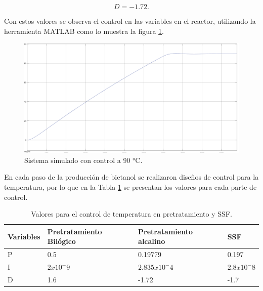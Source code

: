 \documentclass[12pt]{article}
\begin{document}
	\begin{equation}
		D=-1.72.
	\end{equation}
	
	Con estos valores se observa el control en las variables en el reactor, utilizando la herramienta MATLAB como lo muestra la figura \ref{sistema simulado}.
	
	\begin{figure}[H]
		\centering
		\includegraphics[width=0.8\linewidth]{imagenes/sistema_controlado}
		\caption{Sistema simulado con control a 90 °C.}
		\label{sistema simulado}
	\end{figure}
	
  En cada paso de la producción de bietanol se realizaron diseños de control para la temperatura, por lo que en la Tabla \ref{tabla_control} se presentan los valores para cada parte de control.
	 
	
	
	\begin{table}[H]
		\centering
		\caption{Valores para el control de temperatura en pretratamiento y SSF.}
		\begin{tabular}{|l|l|l|l|}
			\hline
			Variables & Pretratamiento Bilógico & Pretratamiento alcalino & SSF \\ \hline
			P & 0.5 & 0.19779 & 0.197 \\ \hline
	    	I & $2 x10^-9 $ & $2.835 x10^-4 $ & $2.8 x10^-8 $ \\ \hline
			D & 1.6 & -1.72 & -1.7 \\ \hline
\end{tabular}
\label{tabla_control}
\end{table}
	
	
	
	
	
	
\end{document}

